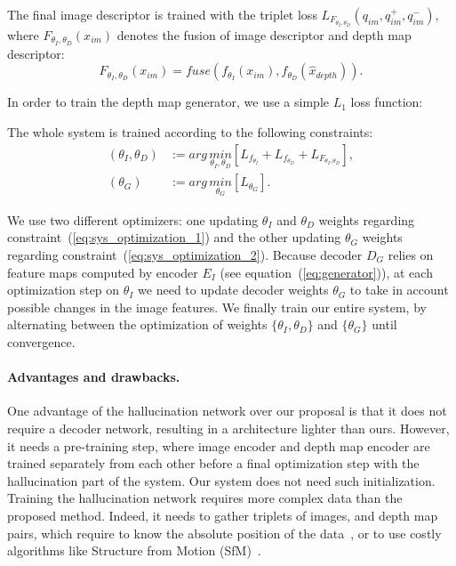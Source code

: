 The final image descriptor is trained with the triplet loss $L_{F_{\theta_{I}, \theta_{D}}}({q}_{im}, {q}_{im}^+, {q}_{im}^-)$, where $F_{\theta_{I},\theta_{D}}(x_{im})$ denotes the fusion of image descriptor and depth map descriptor: 
\begin{equation}
\label{eq:desc_fuse}
F_{\theta_{I},\theta_{D}}(x_{im}) = fuse \left( f_{\theta_{I}}(x_{im}), f_{\theta_{D}}(\hat{x}_{depth}) \right).
\end{equation}

In order to train the depth map generator, we use a simple $L_1$ loss function:

The whole system is trained according to the following constraints:
\begin{align}
	\left( \theta_{I}, \theta_{D} \right) & := arg\,\underset{\theta_{I}, \theta_{D}}{min} \left[ L_{f_{\theta_{I}}} + L_{f_{\theta_{D}}} + L_{F_{\theta_{I},\theta_{D}}} \right], \label{eq:sys_optimization_1} \\ 	
	\left( \theta_{G} \right) & := arg\,\underset{\theta_{G}}{min} \left[ L_{\theta_{G}} \right]. 	\label{eq:sys_optimization_2}
\end{align}

We use two different optimizers: one updating $\theta_{I}$ and $\theta_{D}$ weights regarding constraint~(\ref{eq:sys_optimization_1}) and the other updating $\theta_{G}$ weights regarding constraint~(\ref{eq:sys_optimization_2}). Because decoder $D_G$ relies on feature maps computed by encoder $E_I$ (see equation~(\ref{eq:generator})), at each optimization step on $\theta_{I}$ we need to update decoder weights $\theta_{G}$ to take in account possible changes in the image features. We finally train our entire system, by alternating between the optimization of weights $\{\theta_{I}, \theta_{D}\}$ and $\{\theta_G\}$ until convergence.

\paragraph{Advantages and drawbacks.}
\label{paragraph:adv}
One advantage of the hallucination network over our proposal is that it does not require a decoder network, resulting in a architecture lighter than ours. However, it needs a pre-training step, where image encoder and depth map encoder are trained separately from each other before a final optimization step with the hallucination part of the system. Our system does not need such initialization. Training the hallucination network requires more complex data than the proposed method. Indeed, it needs to gather triplets of images, and depth map pairs, which require to know the absolute position of the data~\citep{Arandjelovic2017,Liu2018}, or to use costly algorithms like Structure from Motion (SfM)~\citep{Godard2017,Radenovic2017,Kim2017a}. 

